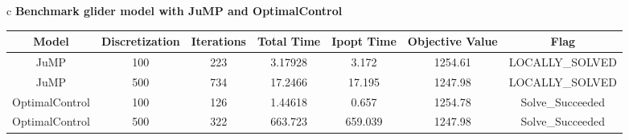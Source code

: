 \documentclass{standalone}
\begin{document}
\begin{tabular}{c}
\hline
\Large\textbf{Benchmark glider model with JuMP and OptimalControl}\\
\begin{tabular}{ccccccc}
  \hline
  \textbf{Model} & \textbf{Discretization} & \textbf{Iterations} & \textbf{Total Time} & \textbf{Ipopt Time} & \textbf{Objective Value} & \textbf{Flag} \\\hline
  JuMP & 100 & 223 & 3.17928 & 3.172 & 1254.61 & LOCALLY\_SOLVED \\
  JuMP & 500 & 734 & 17.2466 & 17.195 & 1247.98 & LOCALLY\_SOLVED \\
  OptimalControl & 100 & 126 & 1.44618 & 0.657 & 1254.78 & Solve\_Succeeded \\
  OptimalControl & 500 & 322 & 663.723 & 659.039 & 1247.98 & Solve\_Succeeded \\\hline
\end{tabular}
\end{tabular}
\end{document}

